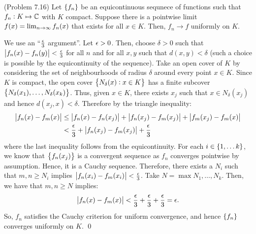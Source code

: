 \begin{ntheorem}{ (Problem 7.16)}{}
    Let $\set{f_n}$ be an equicontinuous sequnece of functions such that $f_n: K \mapsto \mathbb{C}$ with $K$ compact. Suppose there is a pointwise limit $f(x) = \lim_{n \rightarrow \infty} f_n(x)$ that exists for all $x \in K$. Then, $f_n \rightarrow f$ uniformly on $K$.
\end{ntheorem}
\begin{nproof}
    We use an ``$\frac{\epsilon}{3}$ argument''. Let $\epsilon > 0$. Then, choose $\delta > 0$ such that $\abs{f_n(x) - f_n(y)} < \frac{\epsilon}{3}$ for all $n$ and for all $x, y$ such that $d(x, y) < \delta$ (such a choice is possible by the equicontinuity of the sequence). Take an open cover of $K$ by considering the set of neighbourhoods of radius $\delta$ around every point $x \in K$. Since $K$ is compact, the open cover $\set{N_{\delta}(x): x \in K}$ has a finite subcover $\set{N_\delta(x_1), \ldots, N_\delta(x_k)}$. Thus, given $x \in K$, there exists $x_j$ such that $x \in N_\delta(x_j)$ and hence $d(x_j, x) < \delta$. Therefore by the triangle inequality:
    \begin{align*}
        \abs{f_n(x) - f_m(x)} &\leq \abs{f_n(x) - f_n(x_j)} + \abs{f_n(x_j) - f_m(x_j)} + \abs{f_m(x_j) - f_m(x)}
        \\ &< \frac{\epsilon}{3} + \abs{f_n(x_j) - f_m(x_j)} + \frac{\epsilon}{3}
    \end{align*}
    where the last inequality follows from the equicontinuity. For each $i \in \set{1, \ldots k}$, we know that $\set{f_n(x_j)}$ is a convergent sequence as $f_n$ converges pointwise by assumption. Hence, it is a Cauchy sequence. Therefore, there exists a $N_i$ such that $m, n \geq N_i$ implies $\abs{f_n(x_i) - f_m(x_i)} < \frac{\epsilon}{3}$. Take $N = \max{N_1, \ldots, N_k}$. Then, we have that $m, n \geq N$ implies:
    \begin{align*}
        \abs{f_n(x) - f_m(x)} < \frac{\epsilon}{3} + \frac{\epsilon}{3} + \frac{\epsilon}{3} = \epsilon.
    \end{align*}
    So, $f_n$ satisfies the Cauchy criterion for uniform convergence, and hence $\set{f_n}$ converges uniformly on $K$. \qed
\end{nproof}

\setcounter{rudin}{23}

